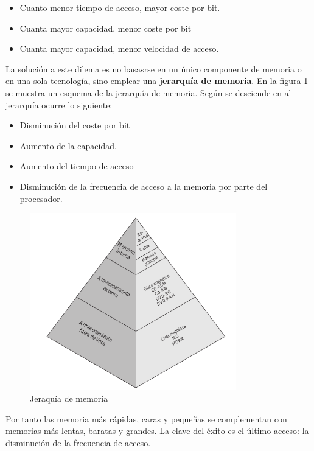 \documentclass{article}
\begin{document}
		\begin{itemize}
		\item Cuanto menor tiempo de acceso, mayor coste por bit.
		\item Cuanta mayor capacidad, menor coste por bit
		\item Cuanta mayor capacidad, menor velocidad de acceso.
		\end{itemize}
		
		La solución a este dilema es no basasrse en un único componente de memoria o en una sola tecnología, sino emplear una \textbf{jerarquía de memoria}. En la figura \ref{jerarquia de memoria} se muestra un esquema de la jerarquía de memoria. Según se desciende en al jerarquía ocurre lo siguiente:
		
		\begin{itemize}
		\item Disminución del coste por bit
		\item Aumento de la capacidad.
		\item Aumento del tiempo de acceso
		\item Disminución de la frecuencia de acceso a la memoria por parte del procesador.
		\end{itemize}
		
		\begin{figure}
		\centering
		\caption{Jeraquía de memoria}
		\label{jerarquia de memoria}
		\includegraphics[width=0.8\textwidth,scale=1]{tema_3_figura1.png}
		\end{figure}
		
		Por tanto las memoria más rápidas, caras y pequeñas se complementan con memorias más lentas, baratas y grandes. La clave del éxito es el último acceso: la disminución de la frecuencia de acceso. \\
		
\end{document}
